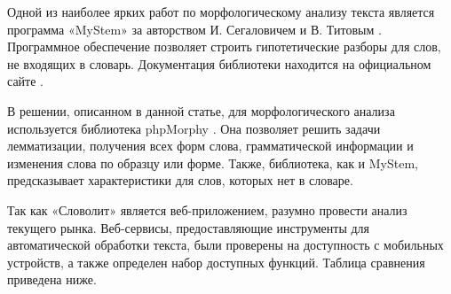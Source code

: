 \documentclass[a4paper,12pt]{article}
\begin{document}
Одной из наиболее ярких работ по морфологическому анализу текста является программа «MyStem» за авторством И. Сегаловичем и В. Титовым \cite{mystem_paper}. Программное обеспечение позволяет строить гипотетические разборы для слов, не входящих в словарь. Документация библиотеки находится на официальном сайте \cite{mystem}.

В решении, описанном в данной статье, для морфологического анализа используется библиотека phpMorphy \cite{phpmorphy}. Она позволяет решить задачи лемматизации, получения всех форм слова, грамматической информации и изменения слова по образцу или форме. Также, библиотека, как и MyStem, предсказывает характеристики для слов, которых нет в словаре.

Так как «Словолит» является веб-приложением, разумно провести анализ текущего рынка. Веб-сервисы, предоставляющие инструменты для автоматической обработки текста, были проверены на доступность с мобильных устройств, а также определен набор доступных функций. Таблица сравнения приведена ниже.
\end{document}
